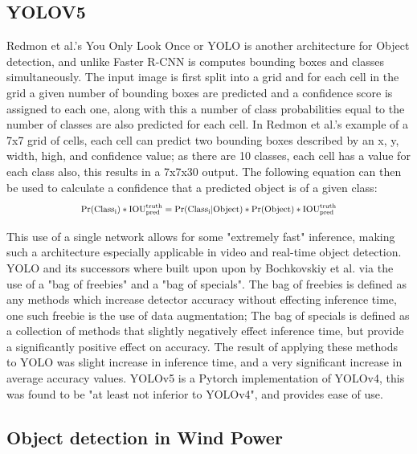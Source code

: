 \documentclass[conference]{IEEEtran}
\begin{document}
\subsection{YOLOV5}
Redmon et al.'s \cite{redmon2016you} You Only Look Once or YOLO is another architecture for Object detection, and unlike Faster R-CNN is computes bounding boxes and classes simultaneously. The input image is first split into a grid and for each cell in the grid a given number of bounding boxes are predicted and a confidence score is assigned to each one, along with this a number of class probabilities equal to the number of classes are also predicted for each cell. In Redmon et al.'s example of a 7x7 grid of cells, each cell can predict two bounding boxes described by an x, y, width, high, and confidence value; as there are 10 classes, each cell has a value for each class also, this results in a 7x7x30 output. The following equation can then be used to calculate a confidence that a predicted object is of a given class:
\newcommand*{\Scale}[2][4]{\scalebox{#1}{$#2$}}%
\[\Scale[0.8]{\mathrm{Pr}(\mathrm{Class_i})*\mathrm{IOU}^{\mathrm{truth}}_{\mathrm{pred}}=\mathrm{Pr}(\mathrm{Class_i}|\mathrm{Object})*\mathrm{Pr}(\mathrm{Object})*\mathrm{IOU}^{\mathrm{truth}}_{\mathrm{pred}}}\]

This use of a single network allows for some "extremely fast" inference, making such a architecture especially applicable in video and real-time object detection. YOLO and its successors where built upon upon by Bochkovskiy et al. \cite{bochkovskiy2020yolov4} via the use of a "bag of freebies" and a "bag of specials". The bag of freebies is defined as any methods which increase detector accuracy without effecting inference time, one such freebie is the use of data augmentation; The bag of specials is defined as a collection of methods that slightly negatively effect inference time, but provide a significantly positive effect on accuracy. The result of applying these methods to YOLO was slight increase in inference time, and a very significant increase in average accuracy values. YOLOv5 \cite{https://doi.org/10.5281/zenodo.4679653} is a Pytorch implementation of YOLOv4, this was found to be "at least not inferior to YOLOv4"\cite{thuan2021evolution}, and provides ease of use.


\subsection{Object detection in Wind Power}
\end{document}
